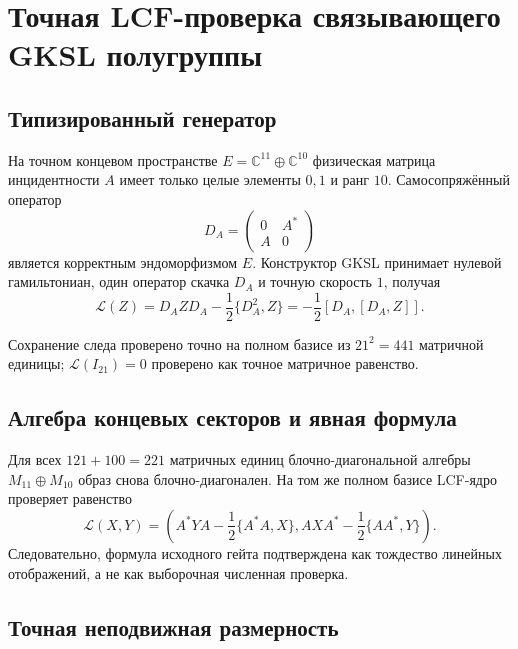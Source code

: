 \chapter{Точная LCF-проверка связывающего GKSL полугруппы}
\label{ch:v8-linking-qms-gksl-lcf-migration-gate}

\section{Типизированный генератор}

На точном концевом пространстве
$E=\mathbb C^{11}\oplus\mathbb C^{10}$ физическая матрица инцидентности $A$
имеет только целые элементы $0,1$ и ранг $10$. Самосопряжённый оператор
\begin{equation}
 D_A=\begin{pmatrix}0&A^*\\A&0\end{pmatrix}
 \label{eq:v8-lcf-linking-dirac}
\end{equation}
является корректным эндоморфизмом $E$. Конструктор GKSL принимает нулевой
гамильтониан, один оператор скачка $D_A$ и точную скорость $1$, получая
\begin{equation}
 \mathcal L(Z)=D_AZD_A-\frac12\{D_A^2,Z\}
 =-\frac12[D_A,[D_A,Z]].
 \label{eq:v8-lcf-linking-gksl}
\end{equation}

Сохранение следа проверено точно на полном базисе из $21^2=441$ матричной
единицы; $\mathcal L(I_{21})=0$ проверено как точное матричное равенство.

\section{Алгебра концевых секторов и явная формула}

Для всех $121+100=221$ матричных единиц блочно-диагональной алгебры
$M_{11}\oplus M_{10}$ образ снова блочно-диагонален. На том же полном базисе
LCF-ядро проверяет равенство
\begin{equation}
 \mathcal L(X,Y)=\left(
 A^*YA-\frac12\{A^*A,X\},
 AXA^*-\frac12\{AA^*,Y\}
 \right).
 \label{eq:v8-lcf-linking-corner-formula}
\end{equation}
Следовательно, формула исходного гейта подтверждена как тождество линейных
отображений, а не как выборочная численная проверка.

\section{Точная неподвижная размерность}

